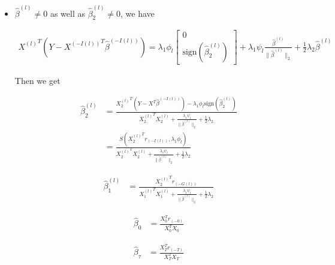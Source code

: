 \documentclass[12pt]{article}
\begin{document}
\begin{itemize}
\item $\hat{\beta}^{(l)}\neq 0$ as well as $\hat{\beta}_2^{(l)}\neq 0$, we have

\begin{align}
  {X^{(l)}}^T(Y-  {X^{(-I(l))}}^T \hat{\beta}^{(-I(l))})=\lambda_1\phi_l \begin{bmatrix}
    0 \\
    \text{sign}(\hat{\beta}_2^{(l)})
  \end{bmatrix}
  + \lambda_1\psi_l \frac{\hat{\beta}^{(l)}}{\parallel \hat{\beta}^{(l)} \parallel_2 } +\frac{1}{2}\lambda_2\hat{\beta}^{(l)}
\end{align}

Then we get

\begin{equation} 
  \begin{split}
  \hat{\beta}_2^{(l)} & =\frac{ {X_2^{(l)}}^T (Y-X^T\hat{\beta}^{(-I(l))})-\lambda_1\phi_l\text{sign}(\hat{\beta}_2^{(l)})}{{X_2^{(l)}}^TX_2^{(l)}+\frac{\lambda_1\psi_l}{\parallel \hat{\beta}^{(l)} \parallel_2} + \frac{1}{2}\lambda_2} \\
  & = \frac{ S( {X_2^{(l)}}^Tr_{(-I(l))}, \lambda_1\phi_l ) }{ {X_2^{(l)}}^TX_2^{(l)}+\frac{\lambda_1\psi_l}{\parallel \hat{\beta}^{(l)} \parallel_2} + \frac{1}{2}\lambda_2 } 
\end{split}
\end{equation}
  
  \begin{equation} 
    \begin{split}
  \hat{\beta}_1^{(l)} & =  \frac{ {X_2^{(l)}}^T r_{(-G(l))} }{ {X_1^{(l)}}^TX_1^{(l)}+\frac{\lambda_1\psi_l}{\parallel \hat{\beta}^{(l)} \parallel_2} + \frac{1}{2}\lambda_2 } 
\end{split}
\end{equation}
  
  \begin{equation} 
    \begin{split}
  \hat{\beta}_0 & = \frac{ X_0^T r_{(-0)} }{ X_0^TX_0 } 
\end{split}
\end{equation}
  
  \begin{equation} 
    \begin{split}
  \hat{\beta}_{\tau} & = \frac{ X_T^T r_{(-T)} }{ X_T^TX_T }
\end{split}
\end{equation}

\end{itemize}
\end{document}

